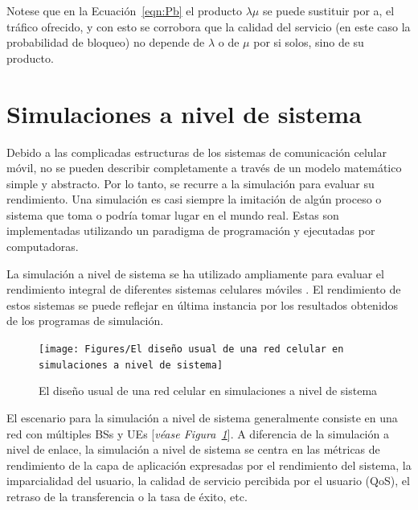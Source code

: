 Notese que en la Ecuación~\ref{eqn:Pb} el producto $\lambda \mu$ se puede sustituir por a, el tráfico ofrecido, y con esto se corrobora que la calidad del servicio (en este caso la probabilidad de bloqueo) no depende de $\lambda$ o de $\mu$ por si solos, sino de su producto.


\section{Simulaciones a nivel de sistema}

Debido a las complicadas estructuras de los sistemas de comunicación celular móvil, no se pueden describir completamente a través de un modelo matemático simple y abstracto. Por lo tanto, se recurre a la simulación para evaluar su rendimiento. Una simulación es casi siempre la imitación de algún proceso o sistema que toma o podría tomar lugar en el mundo real. Estas son implementadas utilizando un paradigma de programación y ejecutadas por computadoras. \newline

La simulación a nivel de sistema se ha utilizado ampliamente para evaluar el rendimiento integral de diferentes sistemas celulares móviles \parencite{Chen2011}. El rendimiento de estos sistemas se puede reflejar en última instancia por los resultados obtenidos de los programas de simulación.\newline

\begin{figure}[th]
\centering
\texttt{[image: Figures/El diseño usual de una red celular en simulaciones a nivel de sistema]}
\decoRule
\caption[El diseño usual de una red celular en simulaciones a nivel de sistema]{El diseño usual de una red celular en simulaciones a nivel de sistema}
\label{fig:sim_sistema}
\end{figure}

El escenario para la simulación a nivel de sistema generalmente consiste en una red con múltiples BSs y UEs [\textit{véase Figura~\ref{fig:sim_sistema}}]. A diferencia de la simulación a nivel de enlace, la simulación a nivel de sistema se centra en las métricas de rendimiento de la capa de aplicación expresadas por el rendimiento del sistema, la imparcialidad del usuario, la calidad de servicio percibida por el usuario (QoS), el retraso de la transferencia o la tasa de éxito, etc.\newline

